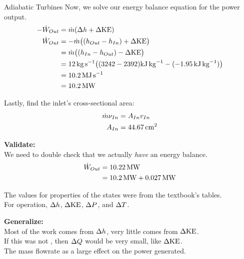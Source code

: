 \begin{example}{Adiabatic Turbines}
  Now, we solve our energy balance equation for the power output.
  \begin{align*}
    -\dot{W}_{Out} &= \dot{m} (\Delta h + \Delta \mathrm{KE}) \\
    \dot{W}_{Out} &= -\dot{m} \bigl( (h_{Out} - h_{In}) + \Delta \mathrm{KE} \bigr) \\
                            &= \dot{m} \bigl( (h_{In} - h_{Out}) - \Delta \mathrm{KE} \bigr) \\
                            &= \SI{12}{\kilo\gram\per\second} \bigl( (3242 - 2392)\si{\kilo\joule\per\kilo\gram} - (-\SI{1.95}{\kilo\joule\per\kilo\gram}) \bigr) \\
                            &= \SI{10.2}{\mega\joule\per\second} \\
                            &= \SI{10.2}{\mega\watt}
  \end{align*}

  Lastly, find the inlet's cross-sectional area:
  \begin{align*}
    \dot{m} \nu_{In} &= A_{In} v_{In} \\
    A_{In} &= \SI{44.67}{\centi\meter\squared}
  \end{align*}

  \textbf{Validate:} \\
  We need to double check that we actually \textit{have} an energy balance.
  \begin{align*}
    \dot{W}_{Out} &= \SI{10.22}{\mega\watt} \\
    &= \SI{10.2}{\mega\watt} + \SI{0.027}{\mega\watt}
  \end{align*}

  The values for properties of the states were from the textbook's tables.\\
  For  operation, $\Delta h$, $\Delta \mathrm{KE}$, $\Delta P$, and $\Delta T$.

  \textbf{Generalize:} \\
  Most of the work comes from $\Delta h$, very little comes from $\Delta \mathrm{KE}$. \\
  If this was not , then $\Delta Q$ would be very small, like $\Delta \mathrm{KE}$. \\
  The mass flowrate as a large effect on the power generated.
\end{example}

